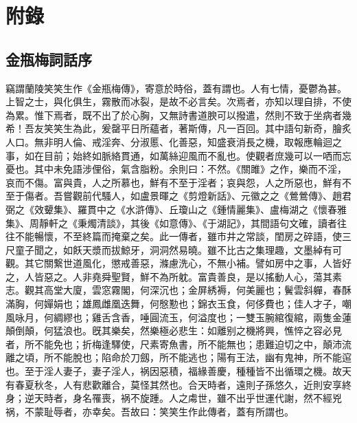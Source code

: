 \part*{附錄}

\chapter*{金瓶梅詞話序}


竊謂蘭陵笑笑生作《金瓶梅傳》，寄意於時俗，蓋有謂也。人有七情，憂鬱為甚。上智之士，與化俱生，霧散而冰裂，是故不必言矣。次焉者，亦知以理自排，不使為累。惟下焉者，既不出了於心胸，又無詩書道腴可以撥遣，然則不致于坐病者幾希！吾友笑笑生為此，爰罄平日所蘊者，著斯傳，凡一百回。其中語句新奇，膾炙人口。無非明人倫、戒淫奔、分淑慝、化善惡，知盛衰消長之機，取報應輪迴之事，如在目前；始終如脈絡貫通，如萬絲迎風而不亂也。使觀者庶幾可以一哂而忘憂也。其中未免語涉俚俗，氣含脂粉。余則曰：不然。《關雎》之作，樂而不淫，哀而不傷。富與貴，人之所慕也，鮮有不至于淫者；哀與怨，人之所惡也，鮮有不至于傷者。吾嘗觀前代騷人，如盧景暉之《剪燈新話》、元徽之之《鶯鶯傳》、趙君弼之《效顰集》、羅貫中之《水滸傳》、丘瓊山之《鍾情麗集》、盧梅湖之《懷春雅集》、周靜軒之《秉燭清談》，其後《如意傳》、《于湖記》，其間語句文確，讀者往往不能暢懷，不至終篇而掩棄之矣。此一傳者，雖市井之常談，閨房之碎語，使三尺童子聞之，如飫天漿而拔鯨牙，洞洞然易曉。雖不比古之集理趣，文墨綽有可觀。其它關繋世道風化，懲戒善惡，滌慮洗心，不無小補。譬如房中之事，人皆好之，人皆惡之。人非堯舜聖賢，鮮不為所躭。富貴善良，是以搖動人心，蕩其素志。觀其高堂大廈，雲窓霧閣，何深沉也；金屏綉褥，何美麗也；鬢雲斜軃，春酥滿胸，何嬋娟也；雄鳳雌凰迭舞，何慇懃也；錦衣玉食，何侈費也；佳人才子，嘲風咏月，何綢繆也；雞舌含香，唾圓流玉，何溢度也；一雙玉腕綰復綰，兩隻金蓮顛倒顛，何猛浪也。旣其樂矣，然樂極必悲生：如離别之機將興，憔悴之容必見者，所不能免也；折梅逢驛使，尺素寄魚書，所不能無也；患難迫切之中，顛沛流離之頃，所不能脫也；陷命於刀劔，所不能逃也；陽有王法，幽有鬼神，所不能逭也。至于淫人妻子，妻子淫人，祸因惡積，福緣善慶，種種皆不出循環之機。故天有春夏秋冬，人有悲歡離合，莫怪其然也。合天時者，遠則子孫悠久，近則安享終身；逆天時者，身名罹喪，祸不旋踵。人之䖏世，雖不出乎世運代謝，然不經兇祸，不蒙耻辱者，亦幸矣。吾故曰：笑笑生作此傳者，蓋有所謂也。

\begin{quotation}
\end{quotation}


